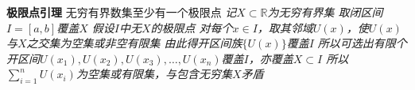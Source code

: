 \documentclass[11pt]{article}
\begin{document}
\textbf{极限点引理}
\newline
无穷有界数集至少有一个极限点
\newline
\textit{记$X\subset\mathbb{R}$为无穷有界集
\newline
取闭区间$I=[a,b]$覆盖$X$
\newline
假设$I$中无$X$的极限点
\newline
对每个$x\in I$，取其邻域$U(x)$，使$U(x)$与$X$之交集为空集或非空有限集
\newline
由此得开区间族$\{U(x)\}$覆盖$I$
\newline
所以可选出有限个开区间$U(x_1),U(x_2),U(x_3),\dots,U(x_n)$覆盖$I$，亦覆盖$X\subset I$
\newline
所以 $\sum\limits_{i=1}^{n}U(x_i)$为空集或有限集，与包含无穷集$X$矛盾}
\end{document}
